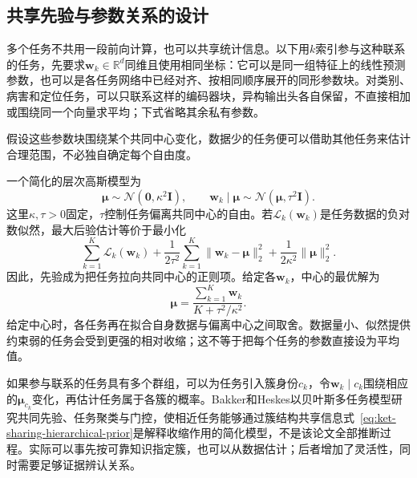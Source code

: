 \subsection{共享先验与参数关系的设计}
\label{sec:ket-sharing-prior}

多个任务不共用一段前向计算，也可以共享统计信息。以下用$k$索引参与这种联系的任务，先要求$\bm w_k\in\mathbb R^d$同维且使用相同坐标：它可以是同一组特征上的线性预测参数，也可以是各任务网络中已经对齐、按相同顺序展开的同形参数块。对类别、病害和定位任务，可以只联系这样的编码器块，异构输出头各自保留，不直接相加或围绕同一个向量求平均；下式省略其余私有参数。

假设这些参数块围绕某个共同中心变化，数据少的任务便可以借助其他任务来估计合理范围，不必独自确定每个自由度。

一个简化的层次高斯模型为
\begin{equation}
  \bm\mu\sim\mathcal N(\bm0,\kappa^2\bm I),
  \qquad
  \bm w_k\mid\bm\mu\sim
  \mathcal N(\bm\mu,\tau^2\bm I).
  \label{eq:ket-sharing-hierarchical-prior}
\end{equation}
这里$\kappa,\tau>0$固定，$\tau$控制任务偏离共同中心的自由。若$\mathcal L_k(\bm w_k)$是任务数据的负对数似然，最大后验估计等价于最小化
\begin{equation}
  \sum_{k=1}^{K}\mathcal L_k(\bm w_k)
  +\frac{1}{2\tau^2}\sum_{k=1}^{K}
     \|\bm w_k-\bm\mu\|_2^2
  +\frac{1}{2\kappa^2}\|\bm\mu\|_2^2.
  \label{eq:ket-sharing-hierarchical-map}
\end{equation}
因此，先验成为把任务拉向共同中心的正则项。给定各$\bm w_k$，中心的最优解为
\begin{equation}
  \bm\mu
  =\frac{\sum_{k=1}^{K}\bm w_k}
    {K+\tau^2/\kappa^2}.
\end{equation}
给定中心时，各任务再在拟合自身数据与偏离中心之间取舍。数据量小、似然提供约束弱的任务会受到更强的相对收缩；这不等于把每个任务的参数直接设为平均值。

如果参与联系的任务具有多个群组，可以为任务引入簇身份$c_k$，令$\bm w_k\mid c_k$围绕相应的$\bm\mu_{c_k}$变化，再估计任务属于各簇的概率。Bakker和Heskes以贝叶斯多任务模型研究共同先验、任务聚类与门控，使相近任务能够通过簇结构共享信息式~\eqref{eq:ket-sharing-hierarchical-prior}是解释收缩作用的简化模型，不是该论文全部推断过程。实际可以事先按可靠知识指定簇，也可以从数据估计；后者增加了灵活性，同时需要足够证据辨认关系。

